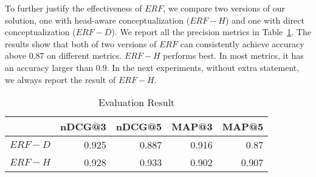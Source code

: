 


To further justify the effectiveness of $ERF$, we compare two versions of our solution, one with head-aware conceptualization ($ERF-H$)
and one with direct conceptualization ($ERF-D$).
We report all the precision metrics in Table~\ref{tab:ndcg}. 
The results show that both of two versions of $ERF$ can consistently achieve accuracy above 0.87 on different metrics.
$ERF-H$ performs best. In most metrics, it has an accuracy larger than 0.9. In the next experiments, without extra statement, we
always report the result of $ERF-H$.


\begin{table}[!htbp]
\vspace{-4mm}
\small	
  \centering
  \caption{Evaluation Result}
	\begin{tabular}{lrrrr}
	\toprule
	     & nDCG@3 & nDCG@5 & MAP@3 & MAP@5 \\
	\midrule
	$ERF-D$ & 0.925 & 0.887 & 0.916 & 0.87 \\
	$ERF-H$ & 0.928 & 0.933 & 0.902 & 0.907 \\
	\bottomrule
	\end{tabular}%

  \label{tab:ndcg}%
\end{table}%



\vspace{-4mm}
